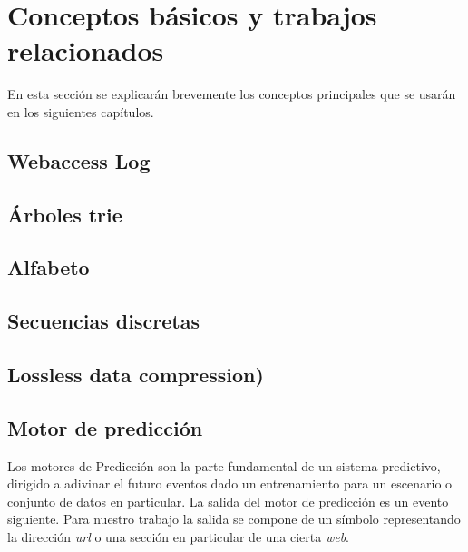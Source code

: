 \section[Conceptos Básicos]{Conceptos básicos y trabajos relacionados} \label{sec:Conceptos-Basicos}


En esta sección se explicarán brevemente los conceptos principales que se usarán en los siguientes capítulos.




\subsection{Webaccess Log}\label{concept-accesslog}
	

\subsection{Árboles trie} \label{concept-trie}

	


\subsection{Alfabeto} \label{concept-alphabet}
	

\subsection{Secuencias discretas}\label{concept-discret-seq}
	


\subsection{Lossless data compression)} \label{concept-LDC}
	


\subsection{Motor de predicción}\label{concept-enginepredict}

	Los motores de Predicción son la parte fundamental de un sistema predictivo, dirigido a adivinar el futuro eventos dado un entrenamiento para un escenario o conjunto de datos en particular. La salida del motor de predicción es un evento siguiente. Para nuestro trabajo la salida se compone de un símbolo representando la dirección \emph{url} o una sección en particular de una cierta \emph{web}. 


